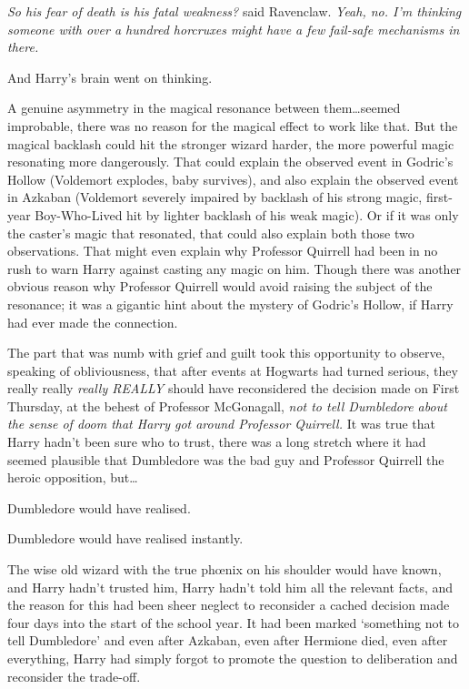 \emph{So his fear of death is his fatal weakness?} said Ravenclaw. \emph{Yeah, no. I’m thinking someone with over a hundred horcruxes might have a few fail-safe mechanisms in there.}

And Harry’s brain went on thinking.

A genuine asymmetry in the magical resonance between them…seemed improbable, there was no reason for the magical effect to work like that. But the magical backlash could hit the stronger wizard harder, the more powerful magic resonating more dangerously. That could explain the observed event in Godric’s Hollow (Voldemort explodes, baby survives), and also explain the observed event in Azkaban (Voldemort severely impaired by backlash of his strong magic, first-year Boy-Who-Lived hit by lighter backlash of his weak magic). Or if it was only the caster’s magic that resonated, that could also explain both those two observations. That might even explain why Professor Quirrell had been in no rush to warn Harry against casting any magic on him. Though there was another obvious reason why Professor Quirrell would avoid raising the subject of the resonance; it was a gigantic hint about the mystery of Godric’s Hollow, if Harry had ever made the connection.

The part that was numb with grief and guilt took this opportunity to observe, speaking of obliviousness, that after events at Hogwarts had turned serious, they really really \emph{really REALLY} should have reconsidered the decision made on First Thursday, at the behest of Professor McGonagall, \emph{not to tell Dumbledore about the sense of doom that Harry got around Professor Quirrell.} It was true that Harry hadn’t been sure who to trust, there was a long stretch where it had seemed plausible that Dumbledore was the bad guy and Professor Quirrell the heroic opposition, but…

Dumbledore would have realised.

Dumbledore would have realised instantly.

The wise old wizard with the true phœnix on his shoulder would have known, and Harry hadn’t trusted him, Harry hadn’t told him all the relevant facts, and the reason for this had been sheer neglect to reconsider a cached decision made four days into the start of the school year. It had been marked ‘something not to tell Dumbledore’ and even after Azkaban, even after Hermione died, even after everything, Harry had simply forgot to promote the question to deliberation and reconsider the trade-off.


